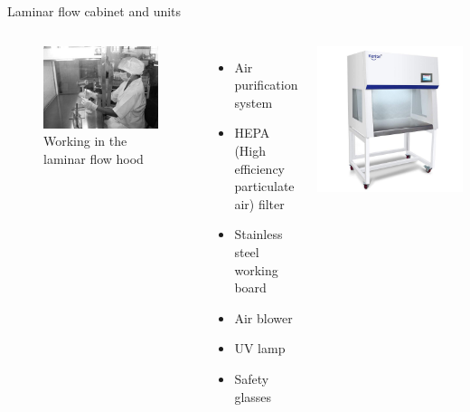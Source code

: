 \documentclass[
  ignorenonframetext,
  aspectratio=169]{beamer}
\begin{document}
\begin{frame}{Laminar flow cabinet and units}
\protect\hypertarget{laminar-flow-cabinet-and-units}{}
\begin{columns}[T,onlytextwidth]

\begin{figure}
\includegraphics[width=0.8\linewidth]{../images/working_laminar_flow_hood} \caption{Working in the laminar flow hood}\label{fig:aseptic-transfer}
\end{figure}

  \begin{itemize}
  \scriptsize
  \item Air purification system
  \item HEPA (High efficiency particulate air) filter
  \item Stainless steel working board
  \item Air blower
  \item UV lamp
  \item Safety glasses
  \end{itemize}



\includegraphics[width=0.8\linewidth]{../images/laminar-hood} 
  
\end{columns}
\end{frame}
\end{document}
